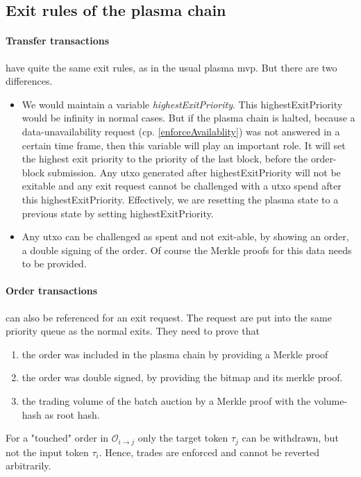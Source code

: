 \documentclass[11pt,parskip=full]{scrartcl}%
\def\pO{\mathcal{O}}
\def\ra{\rightarrow}
\begin{document}
\subsection{Exit rules of the plasma chain}
\label{exitRules}
\paragraph{Transfer transactions} have quite the same exit rules, as in the usual plasma mvp. 
But there are two differences.
\begin{itemize}

 \item We would maintain a variable \emph{highestExitPriority}. 
This highestExitPriority would be infinity in normal cases. 
But if the plasma chain is halted, because a data-unavailability request (cp. \ref{enforceAvailablity}) was not answered in a certain time frame, then this variable will play an important role. 
It will set the highest exit priority to the priority of the last block, before the order-block submission. 
Any utxo generated after highestExitPriority will not be exitable and any exit request cannot be challenged with a utxo spend after this highestExitPriority. 
Effectively, we are resetting the plasma state to a previous state by setting highestExitPriority. 
\item Any utxo can be challenged as spent and not exit-able, by showing an order, a double signing of the order. Of course the Merkle proofs for this data needs to be provided.

\end{itemize}

\paragraph{Order transactions} can also be referenced for an exit request. The request are put into the same priority queue as the normal exits. They need to prove that
\begin{enumerate}
\item the order was included in the plasma chain by providing a Merkle proof
\item the order was double signed, by providing the bitmap and its merkle proof.
\item the trading volume of the batch auction by a Merkle proof with the volume-hash as root hash.
\end{enumerate}
For a "touched" order in $\pO_{i\ra j}$ only the target token $\tau_j$ can be withdrawn, but not the input token $\tau_i$. 
Hence, trades are enforced and cannot be reverted arbitrarily. 
\end{document}
